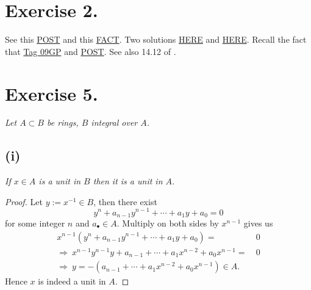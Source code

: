 \section{Exercise 2.}

See this \href{https://math.stackexchange.com/questions/259239/extending-a-homomorphism-of-a-ring-to-an-algebraically-closed-field}{POST} and this \href{https://math.stackexchange.com/questions/1737705/field-of-fractions-of-integral-extension-is-an-algebraic-extension}{FACT}.
Two solutions \href{https://metaphor.ethz.ch/x/2017/hs/401-3132-00L/ex/Sol11.pdf}{HERE} and \href{https://metaphor.ethz.ch/x/2018/hs/401-3132-00L/ex/sol_7.pdf}{HERE}. Recall the fact that \href{https://stacks.math.columbia.edu/tag/09GP}{Tag 09GP} and \href{https://math.stackexchange.com/questions/897660/extending-homomorphism-into-algebraically-closed-field}{POST}. See also 14.12 of \cite{altman}.

\section{Exercise 5.}
\textit{Let $A\subset B$ be rings, $B$ integral over $A$.}
\subsection{(i)} \textit{If $x\in A$ is a unit in $B$ then it is a unit in $A$.}
\begin{proof}
	Let $y:=x^{-1}\in B$, then there exist 
	\[y^n+a_{n-1}y^{n-1}+\cdots+a_1 y +a_0=0\] for some integer $n$ and $a_{\bullet}\in A$. Multiply on both sides by $x^{n-1}$ gives us 
	\begin{align*}
		x^{n-1}(y^n+a_{n-1}y^{n-1}+\cdots+a_1 y +a_0)=&~0\\
		\Rightarrow~ x^{n-1}y^{n-1}y+a_{n-1}+\cdots+a_1x^{n-2}+a_0x^{n-1}=&~0\\
		\Rightarrow~ y=-(a_{n-1}+\cdots+a_1x^{n-2}+a_0x^{n-1})\in A.
	\end{align*}Hence $x$ is indeed a unit in $A$.
\end{proof}

